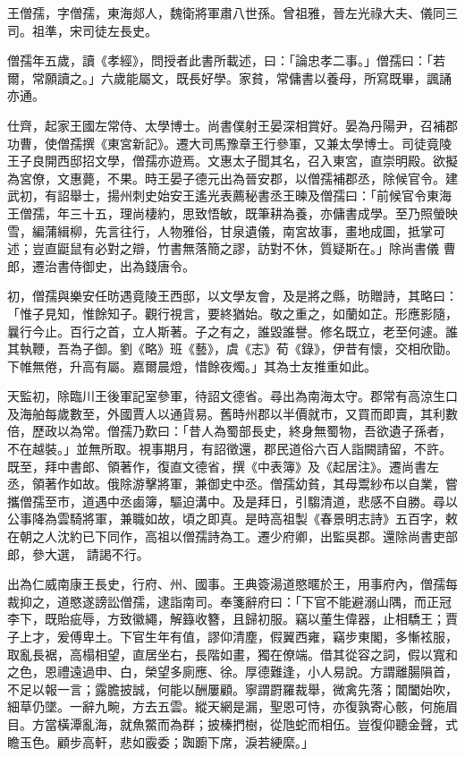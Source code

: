 
\begin{pinyinscope}

 王僧孺，字僧孺，東海郯人，魏衛將軍肅八世孫。曾祖雅，晉左光祿大夫、儀同三司。祖準，宋司徒左長史。



 僧孺年五歲，讀《孝經》，問授者此書所載述，曰：「論忠孝二事。」僧孺曰：「若爾，常願讀之。」六歲能屬文，既長好學。家貧，常傭書以養母，所寫既畢，諷誦亦通。



 仕齊，起家王國左常侍、太學博士。尚書僕射王晏深相賞好。晏為丹陽尹，召補郡
 功曹，使僧孺撰《東宮新記》。遷大司馬豫章王行參軍，又兼太學博士。司徒竟陵王子良開西邸招文學，僧孺亦遊焉。文惠太子聞其名，召入東宮，直崇明殿。欲擬為宮僚，文惠薨，不果。時王晏子德元出為晉安郡，以僧孺補郡丞，除候官令。建武初，有詔舉士，揚州刺史始安王遙光表薦秘書丞王暕及僧孺曰：「前候官令東海王僧孺，年三十五，理尚棲約，思致悟敏，既筆耕為養，亦傭書成學。至乃照螢映雪，編蒲緝柳，先言往行，人物雅俗，甘泉遺儀，南宮故事，畫地成圖，抵掌可述；豈直鼮鼠有必對之辯，竹書無落簡之謬，訪對不休，質疑斯在。」除尚書儀
 曹郎，遷治書侍御史，出為錢唐令。



 初，僧孺與樂安任昉遇竟陵王西邸，以文學友會，及是將之縣，昉贈詩，其略曰：「惟子見知，惟餘知子。觀行視言，要終猶始。敬之重之，如蘭如芷。形應影隨，曩行今止。百行之首，立人斯著。子之有之，誰毀誰譽。修名既立，老至何遽。誰其執鞭，吾為子御。劉《略》班《藝》，虞《志》荀《錄》，伊昔有懷，交相欣勖。下帷無倦，升高有屬。嘉爾晨燈，惜餘夜燭。」其為士友推重如此。



 天監初，除臨川王後軍記室參軍，待詔文德省。尋出為南海太守。郡常有高涼生口及海舶每歲數至，外國賈人以通貨易。舊時州郡以半價就市，又買而即賣，其利數
 倍，歷政以為常。僧孺乃歎曰：「昔人為蜀部長史，終身無蜀物，吾欲遺子孫者，不在越裝。」並無所取。視事期月，有詔徵還，郡民道俗六百人詣闕請留，不許。既至，拜中書郎、領著作，復直文德省，撰《中表簿》及《起居注》。遷尚書左丞，領著作如故。俄除游擊將軍，兼御史中丞。僧孺幼貧，其母鬻紗布以自業，嘗攜僧孺至市，道遇中丞鹵簿，驅迫溝中。及是拜日，引騶清道，悲感不自勝。尋以公事降為雲騎將軍，兼職如故，頃之即真。是時高祖製《春景明志詩》五百字，敕在朝之人沈約已下同作，高祖以僧孺詩為工。遷少府卿，出監吳郡。還除尚書吏部郎，參大選，
 請謁不行。



 出為仁威南康王長史，行府、州、國事。王典簽湯道愍暱於王，用事府內，僧孺每裁抑之，道愍遂謗訟僧孺，逮詣南司。奉箋辭府曰：「下官不能避溺山隅，而正冠李下，既貽疵辱，方致徽繩，解籙收簪，且歸初服。竊以董生偉器，止相驕王；賈子上才，爰傅卑土。下官生年有值，謬仰清塵，假翼西雍，竊步東閣，多慚袨服，取亂長裾，高榻相望，直居坐右，長階如畫，獨在僚端。借其從容之詞，假以寬和之色，恩禮遠過申、白，榮望多廁應、徐。厚德難逢，小人易說。方謂離腸隕首，不足以報一言；露膽披誠，何能以酬屢顧。寧謂罻羅裁舉，微禽先落；閶闔始吹，
 細草仍墜。一辭九畹，方去五雲。縱天網是漏，聖恩可恃，亦復孰寄心骸，何施眉目。方當橫潭亂海，就魚鱉而為群；披榛捫樹，從虺蛇而相伍。豈復仰聽金聲，式瞻玉色。顧步高軒，悲如霰委；踟躕下席，淚若綆縻。」




\end{pinyinscope}
